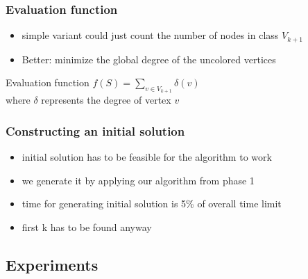 \documentclass{beamer}
\begin{document}
\begin{frame}
    \frametitle{Evaluation function}

    \begin{itemize}
    \item simple variant could just count the number of nodes in class $V_{k+1}$
    \item Better: minimize the global degree of the uncolored vertices
    \end{itemize}

    \begin{block}{Evaluation function}
      $f(S) = \sum\limits_{v \in V_{k+1}} \delta(v)$\\
      where $\delta$ represents the degree of vertex $v$

      \end{block}

  \end{frame}

\begin{frame}
  \frametitle{Constructing an initial solution}
  \begin{itemize}
  \item initial solution has to be feasible for the algorithm to work
  \item we generate it by applying our algorithm from phase 1
  \item time for generating initial solution is 5\% of overall time limit
  \item first k has to be found anyway
\end{itemize}
  \end{frame}

\subsection{Experiments}
\end{document}
